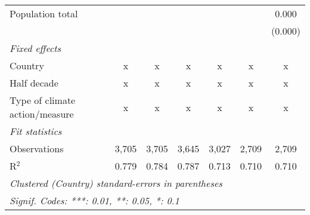 \begin{tabular}{lcccccc}
   Population total                                         &                &                &                &               &              & 0.000\\   
                                                            &                &                &                &               &              & (0.000)\\   
   \emph{Fixed effects}\\
   Country                                                  & x              & x              & x              & x             & x            & x\\  
   Half decade                                              & x              & x              & x              & x             & x            & x\\  
   Type of climate action/measure                           & x              & x              & x              & x             & x            & x\\  
   \midrule \emph{Fit statistics}\\
   Observations                                             & 3,705          & 3,705          & 3,645          & 3,027         & 2,709        & 2,709\\  
   R$^2$                                                    & 0.779          & 0.784          & 0.787          & 0.713         & 0.710        & 0.710\\  
   \midrule
   \multicolumn{7}{l}{\emph{Clustered (Country) standard-errors in parentheses}}\\
   \multicolumn{7}{l}{\emph{Signif. Codes: ***: 0.01, **: 0.05, *: 0.1}}\\
\end{tabular}
\par\endgroup


